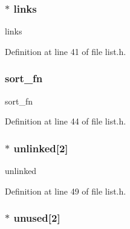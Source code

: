 \hypertarget{structlist__t_abe18f3666455ade0ae39a85fd76e9f88}{}
\subsubsection[{links}]{$\ast$ links}\label{structlist__t_abe18f3666455ade0ae39a85fd76e9f88}


links 



Definition at line 41 of file list.\+h.

\hypertarget{structlist__t_a63ac7c8ef2439d1fe9ed4f15d6b34673}{}
\subsubsection[{sort\+\_\+fn}]{ sort\+\_\+fn}\label{structlist__t_a63ac7c8ef2439d1fe9ed4f15d6b34673}


sort\+\_\+fn 



Definition at line 44 of file list.\+h.

\hypertarget{structlist__t_a1d3f9e10efa30431b659ad02991eabd4}{}
\subsubsection[{unlinked}]{$\ast$ unlinked\mbox{[}2\mbox{]}}\label{structlist__t_a1d3f9e10efa30431b659ad02991eabd4}


unlinked 



Definition at line 49 of file list.\+h.

\hypertarget{structlist__t_a0e724876cc007c8317967a42645e77a7}{}
\subsubsection[{unused}]{$\ast$ unused\mbox{[}2\mbox{]}}\label{structlist__t_a0e724876cc007c8317967a42645e77a7}


